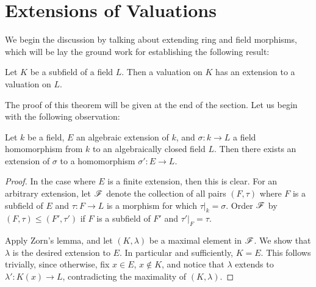 \section{Extensions of Valuations}

We begin the discussion by talking about extending ring and field 
morphisms, which will be lay the ground work for establishing the 
following result:

\begin{thm}\label{thm_ext_val}
Let $K$ be a subfield of a field $L$. Then a valuation on $K$ has 
an extension to a valuation on $L$.
\end{thm}

The proof of this theorem will be given at the end of the section.
Let us begin with the following observation:

\begin{prop}
Let $k$ be a field, $E$ an algebraic extension of $k$, and 
$\sigma: k \to L$ a field homomorphism from $k$ to an 
algebraically closed field $L$. Then there exists an extension of 
$\sigma$ to a homomorphism $\sigma': E \to L$.
\end{prop}

\begin{proof}
In the case where $E$ is a finite extension, then this is clear.
For an arbitrary extension, let $\mathscr{F}$ denote the collection
of all pairs $(F, \tau)$ where $F$ is a subfield of $E$ and 
$\tau: F \to L$ is a morphism for which $\tau|_k = \sigma$. 
Order $\mathscr{F}$ by $(F, \tau) \leq (F', \tau')$ if $F$ is a 
subfield of $F'$ and $\tau'|_F = \tau$.

Apply Zorn's lemma, and let $(K, \lambda)$ be a maximal element
in $\mathscr{F}$. We show that $\lambda$ is the desired extension to 
$E$. In particular and sufficiently, $K = E$. This follows 
trivially, since otherwise, fix $x \in E$, $x \notin K$, and 
notice that $\lambda$ extends to $\lambda': K(x) \to L$, 
contradicting the maximality of $(K, \lambda)$.
\end{proof}

